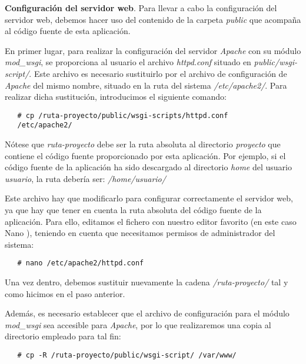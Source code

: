 \item \textbf{Configuración del servidor web}.
   Para llevar a cabo la configuración del servidor web, debemos hacer uso del
   contenido de la carpeta \textit{public} que acompaña al código fuente de
   esta aplicación.

   En primer lugar, para realizar la configuración del servidor \textit{Apache}
   con su módulo \textit{mod\_wsgi}, se proporciona al usuario el archivo
   \textit{httpd.conf} situado en \textit{public/wsgi-script/}. Este archivo
   es necesario sustituirlo por el archivo de configuración de \textit{Apache}
   del mismo nombre, situado en la ruta del sistema \textit{/etc/apache2/}. Para
   realizar dicha sustitución, introducimos el siguiente comando:

   \begin{verbatim}
   # cp /ruta-proyecto/public/wsgi-scripts/httpd.conf
   /etc/apache2/
   \end{verbatim}

   Nótese que \textit{ruta-proyecto} debe ser la ruta absoluta al directorio
   \textit{proyecto} que contiene el código fuente proporcionado por esta
   aplicación. Por ejemplo, si el código fuente de la aplicación ha sido
   descargado al directorio \textit{home} del usuario \textit{usuario},
   la ruta debería ser: \textit{/home/usuario/}

   Este archivo hay que modificarlo para configurar correctamente el servidor
   web, ya que hay que tener en cuenta la ruta absoluta del código fuente de
   la aplicación. Para ello, editamos el fichero con nuestro editor favorito
   (en este caso Nano \cite{nano}), teniendo en cuenta que necesitamos
   permisos de administrador del sistema:

   \begin{verbatim}
   # nano /etc/apache2/httpd.conf
   \end{verbatim}

   Una vez dentro, debemos sustituir nuevamente la cadena
   \textit{/ruta-proyecto/} tal y como hicimos en el paso anterior.

   Además, es necesario establecer que el archivo de configuración para el
   módulo \textit{mod\_wsgi} sea accesible para \textit{Apache}, por lo que
   realizaremos una copia al directorio empleado para tal fin:

   \begin{verbatim}
   # cp -R /ruta-proyecto/public/wsgi-script/ /var/www/
   \end{verbatim}

